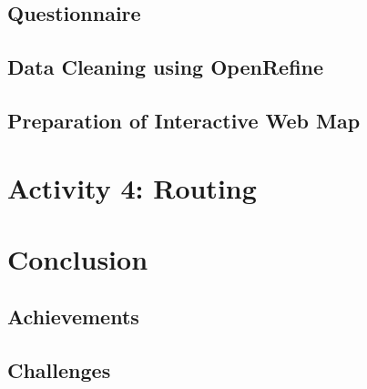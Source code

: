 \documentclass[a4paper,12pt,twoside]{article}
\begin{document}
\subsection{Questionnaire}

    \begin{multicols}{2}
    \lipsum[0-5]
    \end{multicols}

\subsection{Data Cleaning using OpenRefine}

    \begin{multicols}{2}
    \lipsum[0-5]
    \end{multicols}

\subsection{Preparation of Interactive Web Map}

    \begin{multicols}{2}
    \lipsum[0-5]
    \end{multicols}

\section{Activity 4: Routing}

\section{Conclusion}

    \begin{multicols}{2}
    \lipsum[0-5]
    \end{multicols}

\subsection{Achievements}

    \begin{multicols}{2}
    \lipsum[0-5]
    \end{multicols}

\subsection{Challenges}

    \begin{multicols}{2}
    \lipsum[0-5]
    \end{multicols}
\end{document}
